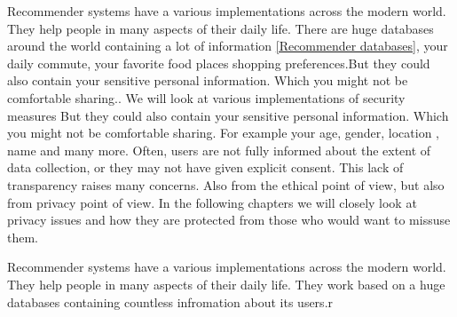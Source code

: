Recommender systems have a various implementations across the modern world. They help people in many aspects of their daily life. There are huge databases around the world containing a lot of information \ref{Recommender databases}, your daily commute, your favorite food places shopping preferences.But they could also contain your sensitive personal information. Which you might not be comfortable sharing.. We will look at various implementations of security measures
But they could also contain your sensitive personal information. Which you might not be comfortable sharing. For example your age, gender, location , name and many more. Often, users are not fully informed about the extent of data collection, or they may not have given explicit consent. This lack of transparency raises many concerns. Also from the ethical point of view, but also from privacy point of view. In the following chapters we will closely look at privacy issues and how they are protected from those who would want to missuse them.

Recommender systems have a various implementations across the modern world. They help people in many aspects of their daily life. They work based on a huge databases containing countless infromation about its users.r

